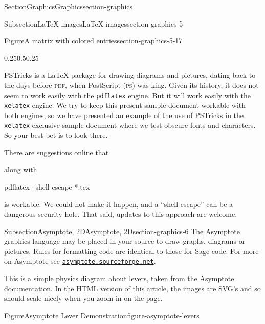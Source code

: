 \documentclass[twoside,10pt,]{article}
\newcommand{\mono}[1]{\texttt{#1}}
\newcommand{\initialism}[1]{\textsc{\MakeLowercase{#1}}}
\numberwithin{equation}{section}
\newcommand{\amp}{&}
\begin{document}
\begin{sectionptx}{Section}{Graphics}{}{Graphics}{}{}{section-graphics}
\begin{subsectionptx}{Subsection}{\LaTeX{} images}{}{\LaTeX{} images}{}{}{section-graphics-5}
\begin{figureptx}{Figure}{A matrix with colored entries}{section-graphics-5-17}{}
\begin{image}{0.25}{0.5}{0.25}{}
{%
}%
\end{image}%
\tcblower
\end{figureptx}%
PSTricks is a \LaTeX{} package for drawing diagrams and pictures, dating back to the days before \initialism{PDF}, when PostScript (\initialism{PS}) was king.  Given its history, it does not seem to work easily with the \mono{pdflatex} engine.  But it will work easily with the \mono{xelatex} engine.  We try to keep this present sample document workable with both engines, so we have presented an example of the use of PSTricks in the \mono{xelatex}-exclusive sample document where we test obscure fonts and characters.  So your best bet is to look there.%
\par
There are suggestions online that%
\begin{codedisplay}
\usepackage[pdf]{pstricks}
\end{codedisplay}
along with%
\begin{codedisplay}
pdflatex --shell-escape *.tex
\end{codedisplay}
is workable.  We could not make it happen, and a ``shell escape'' can be a dangerous security hole.  That said, updates to this approach are welcome.%
\end{subsectionptx}
%
%
\typeout{************************************************}
\typeout{************************************************}
%
\begin{subsectionptx}{Subsection}{Asymptote, 2D}{}{Asymptote, 2D}{}{}{section-graphics-6}
The Asymptote graphics language may be placed in your source to draw graphs, diagrams or pictures.  Rules for formatting code are identical to those for Sage code.  For more on Asymptote see \href{http://asymptote.sourceforge.net/}{\nolinkurl{asymptote.sourceforge.net}}.%
\par
This is a simple physics diagram about levers, taken from the Asymptote documentation.  In the HTML version of this article, the images are SVG's and so should scale nicely when you zoom in on the page.%
\begin{figureptx}{Figure}{Asymptote Lever Demonstration}{figure-asymptote-levers}{}%

\end{figureptx}
\end{subsectionptx}
\end{sectionptx}
\end{document}
